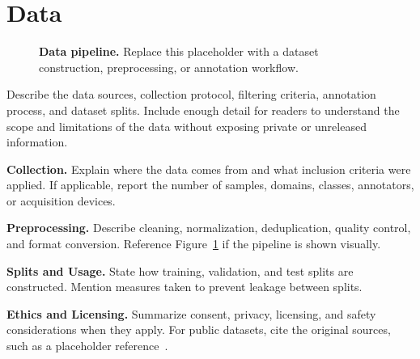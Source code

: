 \section{Data}
\label{sec:data}

\begin{figure}[t]
  \centering
  \caption{\textbf{Data pipeline.} Replace this placeholder with a dataset construction, preprocessing, or annotation workflow.}
  \label{fig:data_pipeline}
\end{figure}

Describe the data sources, collection protocol, filtering criteria, annotation process, and dataset splits.
Include enough detail for readers to understand the scope and limitations of the data without exposing private or unreleased information.

\textbf{Collection.}
Explain where the data comes from and what inclusion criteria were applied.
If applicable, report the number of samples, domains, classes, annotators, or acquisition devices.

\textbf{Preprocessing.}
Describe cleaning, normalization, deduplication, quality control, and format conversion.
Reference Figure~\ref{fig:data_pipeline} if the pipeline is shown visually.

\textbf{Splits and Usage.}
State how training, validation, and test splits are constructed.
Mention measures taken to prevent leakage between splits.

\textbf{Ethics and Licensing.}
Summarize consent, privacy, licensing, and safety considerations when they apply.
For public datasets, cite the original sources, such as a placeholder reference~\cite{sample_reference}.
